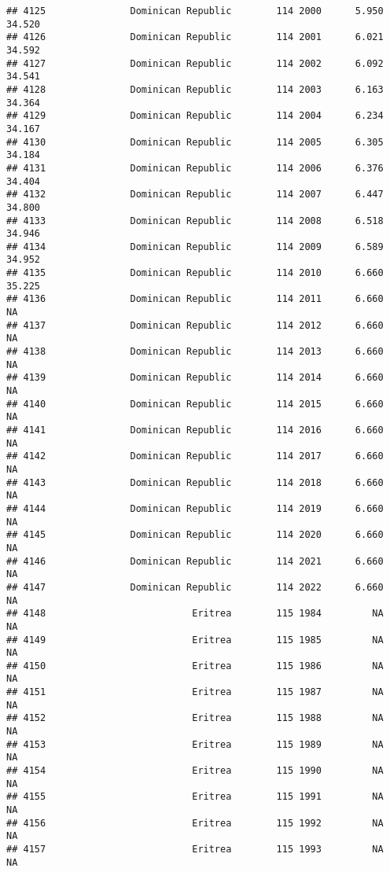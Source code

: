 \documentclass[
]{article}
\begin{document}
\begin{verbatim}
## 4125               Dominican Republic        114 2000      5.950     34.520
## 4126               Dominican Republic        114 2001      6.021     34.592
## 4127               Dominican Republic        114 2002      6.092     34.541
## 4128               Dominican Republic        114 2003      6.163     34.364
## 4129               Dominican Republic        114 2004      6.234     34.167
## 4130               Dominican Republic        114 2005      6.305     34.184
## 4131               Dominican Republic        114 2006      6.376     34.404
## 4132               Dominican Republic        114 2007      6.447     34.800
## 4133               Dominican Republic        114 2008      6.518     34.946
## 4134               Dominican Republic        114 2009      6.589     34.952
## 4135               Dominican Republic        114 2010      6.660     35.225
## 4136               Dominican Republic        114 2011      6.660         NA
## 4137               Dominican Republic        114 2012      6.660         NA
## 4138               Dominican Republic        114 2013      6.660         NA
## 4139               Dominican Republic        114 2014      6.660         NA
## 4140               Dominican Republic        114 2015      6.660         NA
## 4141               Dominican Republic        114 2016      6.660         NA
## 4142               Dominican Republic        114 2017      6.660         NA
## 4143               Dominican Republic        114 2018      6.660         NA
## 4144               Dominican Republic        114 2019      6.660         NA
## 4145               Dominican Republic        114 2020      6.660         NA
## 4146               Dominican Republic        114 2021      6.660         NA
## 4147               Dominican Republic        114 2022      6.660         NA
## 4148                          Eritrea        115 1984         NA         NA
## 4149                          Eritrea        115 1985         NA         NA
## 4150                          Eritrea        115 1986         NA         NA
## 4151                          Eritrea        115 1987         NA         NA
## 4152                          Eritrea        115 1988         NA         NA
## 4153                          Eritrea        115 1989         NA         NA
## 4154                          Eritrea        115 1990         NA         NA
## 4155                          Eritrea        115 1991         NA         NA
## 4156                          Eritrea        115 1992         NA         NA
## 4157                          Eritrea        115 1993         NA         NA

\end{verbatim}
\end{document}
